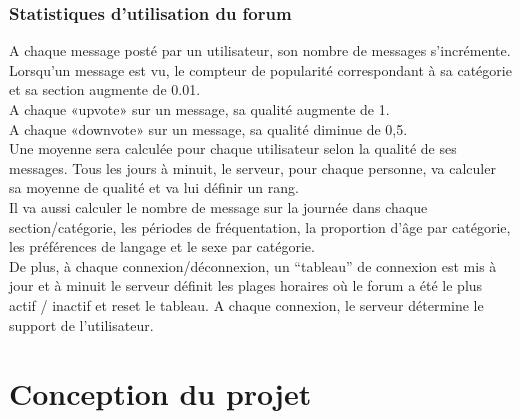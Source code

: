 \documentclass{report}
\begin{document}
\subsection{Statistiques d’utilisation du forum}
		A chaque message posté par un utilisateur, son nombre 	de messages s'incrémente.\\
		Lorsqu'un message est vu, le compteur de popularité 	correspondant à sa catégorie et sa section augmente de 0.01.\\
		A chaque «upvote» sur un message, sa qualité augmente 	de 1.\\
		A chaque «downvote» sur un message, sa qualité 	diminue de 0,5.\\
		Une moyenne sera calculée pour chaque utilisateur selon 	la qualité de ses messages.
		Tous les jours à minuit, le serveur, pour chaque 	personne, va calculer sa moyenne de qualité et va lui définir 	un rang.\\
		Il va aussi calculer le nombre de message sur la journée 	dans chaque section/catégorie, les périodes de fréquentation, 	la proportion d'âge par catégorie, les préférences de langage 	et le sexe par catégorie.\\
		De plus, à chaque connexion/déconnexion, un “tableau” 	de connexion est mis à jour et à minuit le serveur définit les 	plages horaires où le forum a été le plus actif / inactif et reset 	le tableau.
		A chaque connexion, le serveur détermine le support de 	l’utilisateur.\\

\chapter{Conception du projet}
\end{document}
